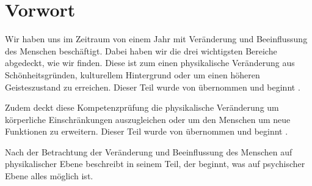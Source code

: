 \chapter{Vorwort}
\label{sec:preface}

Wir haben uns im Zeitraum von einem Jahr mit Veränderung und Beeinflussung des Menschen beschäftigt.
Dabei haben wir die drei wichtigsten Bereiche abgedeckt, wie wir finden. Diese ist zum einen
physikalische Veränderung aus Schönheitsgründen, kulturellem Hintergrund oder um einen höheren
Geisteszustand zu erreichen. Dieser Teil wurde von  übernommen und beginnt
.

Zudem deckt diese Kompetenzprüfung die physikalische Veränderung um körperliche Einschränkungen
auszugleichen oder um den Menschen um neue Funktionen zu erweitern. Dieser Teil wurde von
 übernommen und beginnt .

Nach der Betrachtung der Veränderung und Beeinflussung des Menschen auf physikalischer Ebene
beschreibt  in seinem Teil, der 
beginnt, was auf psychischer Ebene alles möglich ist.
